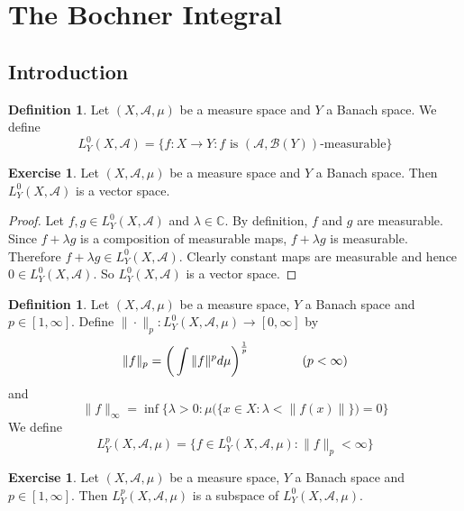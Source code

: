 \documentclass[12pt]{amsart}
\theoremstyle{definition}
\newtheorem{defn}[definition]{Definition}
\newtheorem{ex}[definition]{Exercise}
\newcommand{\lam}{\lambda}
\newcommand{\C}{\mathbb{C}}
\newcommand{\MA}{\mathcal{A}}
\newcommand{\MB}{\mathcal{B}}
\begin{document}
	
	
	
	
	
	
	
	
	
	
	
	
	
	
	
	
	
	\newpage
	\section{The Bochner Integral}
	
	\subsection{Introduction}
	
	\begin{defn}	
	Let $(X, \MA, \mu)$ be a measure space and $Y$ a Banach space. We define $$L_Y^0(X, \MA) = \bigg \{ f:X \rightarrow Y: f \text{ is } (\MA, \MB(Y)) \text{-measurable}\bigg \}$$ 
	\end{defn}
	
	\begin{ex}
	Let $(X, \MA, \mu)$ be a measure space and $Y$ a Banach space. Then $L_Y^0(X, \MA)$ is a vector space.
	\end{ex}
	
	\begin{proof}
	Let $f, g \in L_Y^0(X, \MA)$ and $\lam \in \C$. By definition, $f$ and $g$ are measurable. Since $f+\lam g $ is a composition of measurable maps, $f + \lam g$ is measurable. Therefore $f + \lam g \in L_Y^0(X, \MA)$. Clearly constant maps are measurable and hence $0 \in L_Y^0(X, \MA)$. So $L_Y^0(X, \MA)$ is a vector space. 
	\end{proof}
	
	\begin{defn}
		Let $(X, \MA, \mu)$ be a measure space, $Y$ a Banach space and $p \in [1, \infty]$. Define $  \| \cdot \|_p : L_Y^0(X, \MA, \mu) \rightarrow [0, \infty]$ by $$\|f \|_p = \bigg(\int  \|f\|^p d\mu \bigg)^{\frac{1}{p}} \hspace{1.5cm}( p < \infty)$$ 
		and 
		$$\|f \|_{\infty} = \inf \bigg \{\lam >0: \mu\big(\{x \in X: \lam < \|f(x)\|  \}\big) = 0 \bigg \} $$
		We define $$L_Y^p(X, \MA, \mu) =  \{f \in L_Y^0(X, \MA, \mu): \|f \|_p < \infty \}$$
	\end{defn}	
	
	\begin{ex}
	Let $(X, \MA, \mu)$ be a measure space, $Y$ a Banach space and $p \in [1, \infty]$. Then $L_Y^p(X, \MA, \mu)$ is a subspace of $L_Y^0(X, \MA, \mu)$. 
	\end{ex}
	
\end{document}
